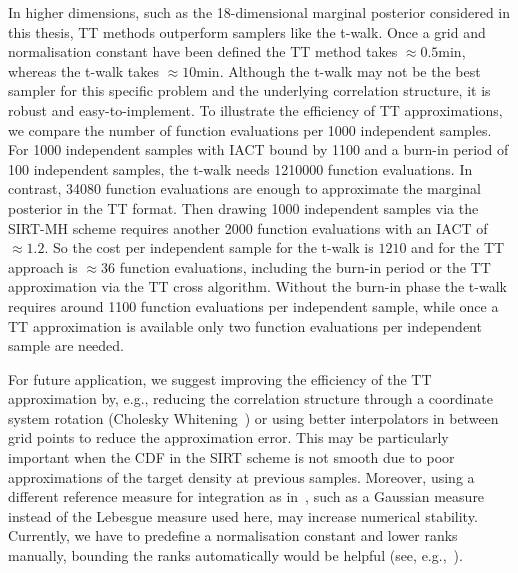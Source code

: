 In higher dimensions, such as the 18-dimensional marginal posterior considered in this thesis, TT methods outperform samplers like the t-walk.
Once a grid and normalisation constant have been defined the TT method takes $\approx0.5$min, whereas the t-walk takes $\approx 10$min.
Although the t-walk may not be the best sampler for this specific problem and the underlying correlation structure, it is robust and easy-to-implement.
To illustrate the efficiency of TT approximations, we compare the number of function evaluations per 1000 independent samples.
For 1000 independent samples with IACT bound by 1100 and a burn-in period of 100 independent samples, the t-walk needs 1210000 function evaluations. 
In contrast, 34080 function evaluations are enough to approximate the marginal posterior in the TT format.
Then drawing 1000 independent samples via the SIRT-MH scheme requires another 2000 function evaluations with an IACT of $\approx 1.2$.
So the cost per independent sample for the t-walk is $1210$ and for the TT approach is $\approx 36$ function evaluations, including the burn-in period or the TT approximation via the TT cross algorithm.
Without the burn-in phase the t-walk requires around 1100 function evaluations per independent sample, while once a TT approximation is available only two function evaluations per independent sample are needed.

For future application, we suggest improving the efficiency of the TT approximation by, e.g., reducing the correlation structure through a coordinate system rotation (Cholesky Whitening~\cite{KessyWhitening2018}) or using better interpolators in between grid points to reduce the approximation error.
This may be particularly important when the CDF in the SIRT scheme is not smooth due to poor approximations of the target density at previous samples.  
Moreover, using a different reference measure for integration as in~\cite{cui2022deep}, such as a Gaussian measure instead of the Lebesgue measure used here, may increase numerical stability.
Currently, we have to predefine a normalisation constant and lower ranks manually, bounding the ranks automatically would be helpful (see, e.g.,~\cite{Rohrbach2022tterror}).



